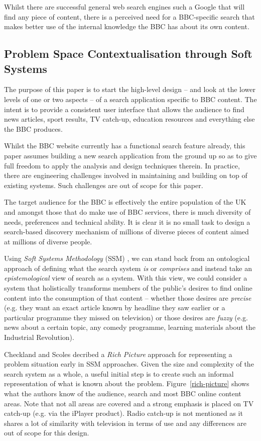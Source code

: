 \documentclass{llncs}
\begin{document}
Whilst there are successful general web search engines such a Google that
will find any piece of content, there is a perceived need for a
BBC-specific search that makes better use of the internal knowledge the BBC
has about its own content.

\subsection{Problem Space Contextualisation through Soft Systems}

The purpose of this paper is to start the high-level design -- and
look at the lower levels of one or two aspects -- of a search application
specific to BBC content. The intent is to provide a consistent user interface
that allows the audience to find news articles, sport results,
TV catch-up, education resources and everything else the BBC produces.

Whilst the BBC website currently has a
functional search feature already, this paper assumes building a new search application
from the ground up so as to give full freedom to apply the analysis and design
techniques therein. In practice, there are engineering challenges involved
in maintaining and building on top of existing systems. Such challenges
are out of scope for this paper.

The target audience for the BBC is effectively the entire population of the UK
and amongst those that do make use of BBC services, there is much diversity
of needs, preferences and technical ability. It is clear it is no small
task to design a search-based discovery mechanism of millions of diverse
pieces of content aimed at millions of diverse people.

Using \emph{Soft Systems Methodology} (SSM)
\cite{checkland2006learning}, we can stand back from
an ontological approach of defining what the search system \emph{is} or
\emph{comprises} and instead take an \emph{epistemological} view of search
as a system. With this view, we could consider a system that holistically
transforms members of the public's desires to find online content into
the consumption of that content -- whether those desires are \emph{precise}
(e.g. they want an exact article known by headline they saw earlier or a
particular programme they missed on television) or those desires are
\emph{fuzzy} (e.g. news about a certain topic, any comedy programme, learning
materials about the Industrial Revolution).

Checkland and Scoles\cite{checkland1990soft} decribed a \emph{Rich Picture} approach
for representing a problem situation early in SSM approaches.
Given the size and complexity of the
search system as a whole, a useful initial step is to create such an informal
representation of what is known about the problem. Figure~\ref{rich-picture}
shows what the authors know of the audience, search and most BBC online content areas.
Note that not all areas are covered and a strong emphasis is placed on TV
catch-up (e.g. via the iPlayer product). Radio catch-up is not mentioned
as it shares a lot of similarity with television in terms of use and any
differences are out of scope for this design.
\end{document}

